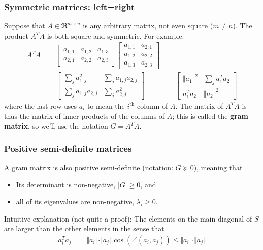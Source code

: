 \documentclass{beamer}
\begin{document}

\begin{frame}
  \frametitle{Symmetric matrices: left=right}

  Suppose that $A\in\Re^{m\times n}$ is any arbitrary matrix, not even
  square ($m\ne n$).  The product $A^TA$ is both square and symmetric.
  For example:
  \begin{align*}
    A^TA &= \left[\begin{array}{ccc}a_{1,1}&a_{1,2}&a_{1,3}\\a_{2,1}&a_{2,2}&a_{2,3}\end{array}\right]
    \left[\begin{array}{cc}a_{1,1}&a_{2,1}\\a_{1,2}&a_{2,2}\\a_{1,3}&a_{2,3}\end{array}\right]\\
    &=
    \left[\begin{array}{cc}\sum_ja_{1,j}^2&\sum_ja_{1,j}a_{2,j}\\\sum_ja_{1,j}a_{2,j}&\sum_ja_{2,j}^2
      \end{array}\right]
    &=
    \left[\begin{array}{cc}\Vert a_1\Vert^2&\sum_ja_1^Ta_2\\a_1^Ta_2&\Vert a_2\Vert^2
      \end{array}\right]
  \end{align*}
  where the last row uses $a_i$ to mean the $i^{\textrm{th}}$ column
  of $A$.  The matrix of $A^TA$ is thus the matrix of inner-products
  of the columns of $A$; this is called the {\bf gram matrix}, so
  we'll use the notation $G=A^TA$.
\end{frame}

\begin{frame}
  \frametitle{Positive semi-definite matrices}

  A gram matrix is also positive semi-definite (notation: $G\succeq
  0$), meaning that
  \begin{itemize}
  \item Its determinant is non-negative, $|G|\ge 0$, and
  \item all of its eigenvalues are non-negative, $\lambda_i \ge 0$.
  \end{itemize}
  Intuitive explanation (not quite a proof): The elements on the main
  diagonal of $S$ are larger than the other elements in the sense that
  \begin{align*}
    a_i^Ta_j &= \Vert a_i\Vert\cdot\Vert a_j\Vert\cos\left(\angle(a_i,a_j)\right)\le\Vert a_i\Vert\cdot
    \Vert a_j\Vert
  \end{align*}
\end{frame}
\end{document}
